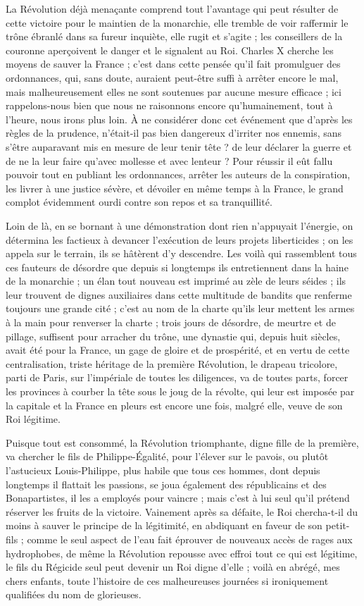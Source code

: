 \documentclass[11pt,a4paper]{report}
\begin{document}
La Révolution déjà menaçante comprend tout l'avantage qui peut résulter de cette victoire pour le maintien de la monarchie, elle tremble de voir raffermir le trône ébranlé dans sa fureur inquiète, elle rugit et s'agite ; les conseillers de la couronne aperçoivent le danger et le signalent au Roi. Charles X cherche les moyens de sauver la France ; c'est dans cette pensée qu'il fait promulguer des ordonnances, qui, sans doute, auraient peut-être suffi à arrêter encore le mal, mais malheureusement elles ne sont soutenues par aucune mesure efficace ; ici rappelons-nous bien que nous ne raisonnons encore qu'humainement, tout à l'heure, nous irons plus loin. À ne considérer donc cet événement que d'après les règles de la prudence, n'était-il pas bien dangereux d'irriter nos ennemis, sans s'être auparavant mis en mesure de leur tenir tête ? de leur déclarer la guerre et de ne la leur faire qu'avec mollesse et avec lenteur ? Pour réussir il eût fallu pouvoir tout en publiant les ordonnances, arrêter les auteurs de la conspiration, les livrer à une justice sévère, et dévoiler en même temps à la France, le grand complot évidemment ourdi contre son repos et sa tranquillité.

Loin de là, en se bornant à une démonstration dont rien n'appuyait l'énergie, on détermina les factieux à devancer l'exécution de leurs projets liberticides ; on les appela sur le terrain, ils se hâtèrent d'y descendre. Les voilà qui rassemblent tous ces fauteurs de désordre que depuis si longtemps ils entretiennent dans la haine de la monarchie ; un élan tout nouveau est imprimé au zèle de leurs séides ; ils leur trouvent de dignes auxiliaires dans cette multitude de bandits que renferme toujours une grande cité ; c'est au nom de la charte qu'ils leur mettent les armes à la main pour renverser la charte ; trois jours de désordre, de meurtre et de pillage, suffisent pour arracher du trône, une dynastie qui, depuis huit siècles, avait été pour la France, un gage de gloire et de prospérité, et en vertu de cette centralisation, triste héritage de la première Révolution, le drapeau tricolore, parti de Paris, sur l'impériale de toutes les diligences, va de toutes parts, forcer les provinces à courber la tête sous le joug de la révolte, qui leur est imposée par la capitale et la France en pleurs est encore une fois, malgré elle, veuve de son Roi légitime.

Puisque tout est consommé, la Révolution triomphante, digne fille de la première, va chercher le fils de Philippe-Égalité, pour l'élever sur le pavois, ou plutôt l'astucieux Louis-Philippe, plus habile que tous ces hommes, dont depuis longtemps il flattait les passions, se joua également des républicains et des Bonapartistes, il les a employés pour vaincre ; mais c'est à lui seul qu'il prétend réserver les fruits de la victoire. Vainement après sa défaite, le Roi chercha-t-il du moins à sauver le principe de la légitimité, en abdiquant en faveur de son petit-fils ; comme le seul aspect de l'eau fait éprouver de nouveaux accès de rages aux hydrophobes, de même la Révolution repousse avec effroi tout ce qui est légitime, le fils du Régicide seul peut devenir un Roi digne d'elle ; voilà en abrégé, mes chers enfants, toute l'histoire de ces malheureuses journées si ironiquement qualifiées du nom de glorieuses.
\end{document}
